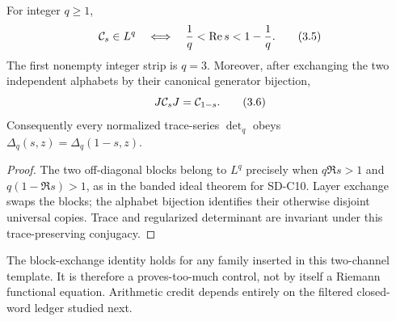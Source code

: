 \begin{proposition}
\label{prop:strip}
For integer $q\ge1$,
\[
 \mathcal C_s\in L^q\quad\Longleftrightarrow\quad
 \frac1q<\operatorname{Re} s<1-\frac1q.               \tag{3.5}
\]
The first nonempty integer strip is $q=3$.  Moreover, after exchanging the
two independent alphabets by their canonical generator bijection,
\[
 J\mathcal C_sJ=\mathcal C_{1-s}.                          \tag{3.6}
\]
Consequently every normalized trace-series $\det_q$ obeys
$\Delta_q(s,z)=\Delta_q(1-s,z)$.
\end{proposition}

\begin{proof}
The two off-diagonal blocks belong to $L^q$ precisely when
$q\Re s>1$ and $q(1-\Re s)>1$, as in the banded ideal theorem for SD-C10.
Layer exchange swaps the blocks; the alphabet bijection identifies their
otherwise disjoint universal copies.  Trace and regularized determinant are
invariant under this trace-preserving conjugacy.
\end{proof}

The block-exchange identity holds for any family inserted in this two-channel
template.  It is therefore a proves-too-much control, not by itself a Riemann
functional equation.  Arithmetic credit depends entirely on the filtered
closed-word ledger studied next.
